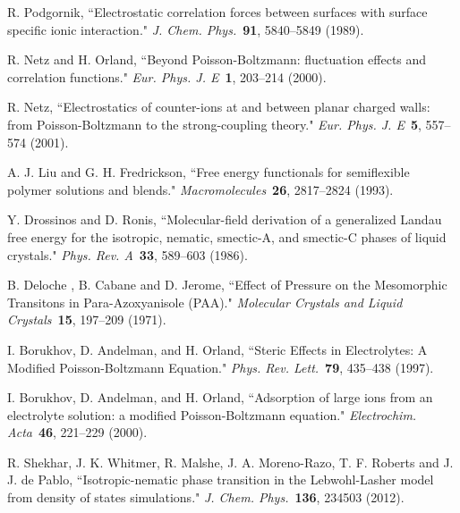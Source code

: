 \documentclass[jcp,aps,twocolumn,showpacs,supergroupedaddress,epsfig,amsmath,amssymb,eqsecnum]{revtex4}
\begin{document}
\begin{thebibliography}{99}
R. Podgornik, ``Electrostatic correlation forces between surfaces with surface specific ionic interaction." 
{\em J. Chem. Phys.}~{\bf 91}, 5840--5849 (1989).

R. Netz and H. Orland, 
``Beyond Poisson-Boltzmann: fluctuation effects and correlation functions."
{\em Eur. Phys. J. E}~{\bf 1}, 203--214 (2000). 

R. Netz, ``Electrostatics of counter-ions at and between planar charged walls: from Poisson-Boltzmann to the strong-coupling theory." 
{\em Eur. Phys. J. E}~{\bf 5}, 557--574 (2001).

A. J. Liu and G. H. Fredrickson, ``Free energy functionals for semiflexible polymer solutions and blends." 
{\em Macromolecules}~{\bf 26}, 2817--2824 (1993).

Y. Drossinos and D. Ronis, ``Molecular-field derivation of a generalized Landau free energy for the isotropic, nematic, smectic-A, and smectic-C phases of liquid crystals."
{\em Phys. Rev. A}~{\bf 33}, 589--603 (1986).

B. Deloche , B. Cabane and D. Jerome, ``Effect of Pressure on the Mesomorphic Transitons in
Para-Azoxyanisole (PAA)." 
{\em Molecular Crystals and Liquid Crystals}~{\bf 15}, 197--209 (1971).    



I. Borukhov, D. Andelman, and H. Orland, 
``Steric Effects in Electrolytes: A Modified Poisson-Boltzmann Equation."
{\em Phys. Rev. Lett.}~{\bf 79}, 435--438 (1997). 

I. Borukhov, D. Andelman, and H. Orland, 
``Adsorption of large ions from an electrolyte solution: a modified Poisson-Boltzmann equation."
{\em Electrochim. Acta}~{\bf 46}, 221--229 (2000).    

R. Shekhar, J. K. Whitmer, R. Malshe, J. A. Moreno-Razo, T. F. Roberts and J. J. de Pablo, 
``Isotropic-nematic phase transition in the Lebwohl-Lasher model from density of states simulations."
{\em J. Chem. Phys.}~{\bf 136}, 234503 (2012). 



\end{thebibliography}
\end{document}
